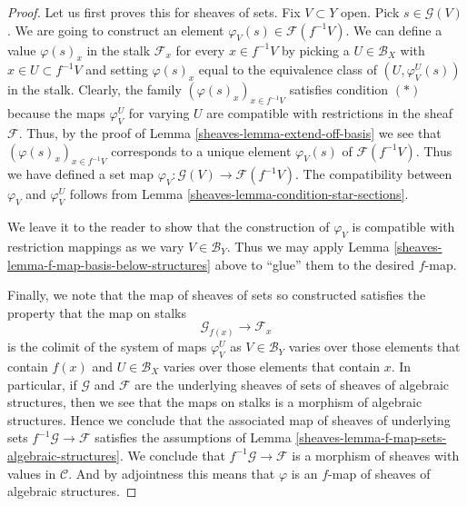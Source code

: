 \begin{proof}

Let us first proves this for sheaves of sets.
Fix $V \subset Y$ open. Pick $s \in \mathcal{G}(V)$.
We are going to construct an element
$\varphi_V(s) \in \mathcal{F}(f^{-1}V)$.
We can define a value $\varphi(s)_x$ in the stalk $\mathcal{F}_x$
for every $x \in f^{-1}V$ by picking a $U \in \mathcal{B}_X$
with $x \in U \subset f^{-1}V$ and setting $\varphi(s)_x$
equal to the equivalence class of $(U, \varphi_V^U(s))$
in the stalk. Clearly, the family $(\varphi(s)_x)_{x \in f^{-1}V}$
satisfies condition $(*)$ because the maps $\varphi_V^U$
for varying $U$
are compatible with restrictions in the sheaf $\mathcal{F}$.
Thus, by the proof of Lemma \ref{sheaves-lemma-extend-off-basis}
we see that $(\varphi(s)_x)_{x \in f^{-1}V}$ corresponds
to a unique element $\varphi_V(s)$ of $\mathcal{F}(f^{-1}V)$.
Thus we have defined a set map
$\varphi_V : \mathcal{G}(V) \to \mathcal{F}(f^{-1}V)$.
The compatibility between $\varphi_V$ and $\varphi_V^U$
follows from Lemma \ref{sheaves-lemma-condition-star-sections}.

\medskip\noindent
We leave it to the reader to show that the construction
of $\varphi_V$ is compatible with restriction mappings as we vary
$V \in \mathcal{B}_Y$. Thus we may apply Lemma
\ref{sheaves-lemma-f-map-basis-below-structures} above to
``glue'' them to the desired $f$-map.

\medskip\noindent
Finally, we note that the map of sheaves of sets so constructed
satisfies the property that the map on stalks
$$
\mathcal{G}_{f(x)} \longrightarrow \mathcal{F}_x
$$
is the colimit of the system of maps $\varphi_V^U$ as
$V \in \mathcal{B}_Y$ varies over those elements that
contain $f(x)$ and $U \in \mathcal{B}_X$ varies over those elements that
contain $x$. In particular, if $\mathcal{G}$ and $\mathcal{F}$
are the underlying sheaves of sets of sheaves of algebraic structures,
then we see that the maps on stalks is a morphism of algebraic
structures. Hence we conclude that the associated map of
sheaves of underlying sets $f^{-1}\mathcal{G} \to \mathcal{F}$
satisfies the assumptions of
Lemma \ref{sheaves-lemma-f-map-sets-algebraic-structures}.
We conclude that $f^{-1}\mathcal{G} \to \mathcal{F}$
is a morphism of sheaves with values in $\mathcal{C}$.
And by adjointness this means that $\varphi$ is
an $f$-map of sheaves of algebraic structures.
\end{proof}

